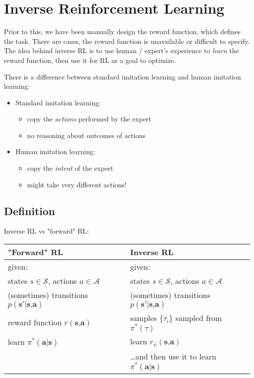 \chapter{Inverse Reinforcement Learning}

Prior to this, we have been manually design the reward function, which defines the task. There are cases, the reward function is unavailable or difficult to specify. The idea behind inverse \ac{RL} is to use human / expert's experience to \textit{learn} the reward function, then use it for \ac{RL} as a goal to optimize.

There is a difference between standard imitation learning and human imitation learning:
\begin{itemize}
	\item Standard imitation learning:
	\begin{itemize}
		\item copy the \textit{actions} performed by the expert
		\item no reasoning about outcomes of actions
	\end{itemize}	
	\item Human imitation learning:
	\begin{itemize}
		\item copy the \textit{intent} of the expert
		\item might take very different actions!
	\end{itemize}	
\end{itemize}

\section{Definition}
Inverse \ac{RL} \ac{vs} "forward" \ac{RL}:
\begin{center}
	\begin{tabular}[hbt!]{l|l}
		"Forward" \ac{RL} & Inverse \ac{RL} \\\hline\hline
		given: & given: \\
		states $s \in \mathcal{S}$, actions $a \in \mathcal{A}$ & states $s \in \mathcal{S}$, actions $a \in \mathcal{A}$\\
		(sometimes) transitions $p(\textbf{s}' | \textbf{s,a})$ & (sometimes) transitions $p(\textbf{s}' | \textbf{s,a})$\\
		reward function $r(\textbf{s,a})$ & samples $\{ \tau_i\}$ sampled from $\pi^*(\tau)$\\ \hline
		learn $\pi^*(\textbf{a}|\textbf{s})$ & learn $r_\psi(\textbf{s,a})$\\
		& \dots and then use it to learn $\pi^*(\textbf{a}|\textbf{s})$
	\end{tabular}
\end{center}

